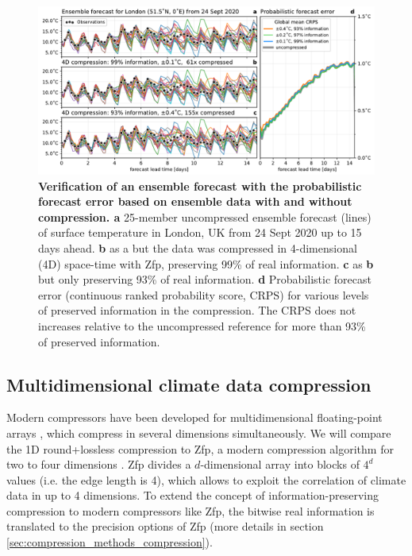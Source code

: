 \begin{figure}[tbhp]
	\includegraphics[width=1\textwidth]{Figures/compression/ensemble_forecast.pdf}
	\caption{\textbf{Verification of an ensemble forecast with the probabilistic forecast error based on ensemble data
	with and without compression. a} 25-member uncompressed ensemble forecast (lines) of surface temperature
	in London, UK from 24 Sept 2020 up to 15 days ahead. \textbf{b} as a but the data was compressed in 4-dimensional
	(4D) space-time with Zfp, preserving 99\% of real information. \textbf{c} as \textbf{b} but only preserving 93\% of real
	information. \textbf{d} Probabilistic forecast error (continuous ranked probability score, CRPS) for various levels of
	preserved information in the compression. The CRPS does not increases relative to the uncompressed reference for
	more than 93\% of preserved information.}
	\label{fig:ensemble_forecast}
\end{figure}

\subsection{Multidimensional climate data compression}

Modern compressors have been developed for multidimensional floating-point arrays
\citep{Lindstrom2006,Di2016,Ballester-Ripoll2020,Zhao2020,vonLarcher2019}, which compress in
several dimensions simultaneously. We will compare the 1D round+lossless compression to Zfp, a modern compression
algorithm for two to four dimensions \citep{Lindstrom2014,Pinard2020a,Poppick2020,Hammerling2019}.
Zfp divides a $d$-dimensional array into blocks of $4^d$  values (i.e. the edge length is 4), which allows to
exploit the correlation of climate data in up to 4 dimensions. To extend the concept of information-preserving
compression to modern compressors like Zfp, the bitwise real information is translated to the precision options of Zfp
(more details in section \ref{sec:compression_methods_compression}).

